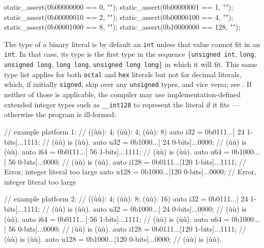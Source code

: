 \begin{emcppslisting}
static_assert(0b00000000 ==   0, "");
static_assert(0b00000001 ==   1, "");
static_assert(0b00000010 ==   2, "");
static_assert(0b00000100 ==   4, "");
static_assert(0b00001000 ==   8, "");
static_assert(0b10000000 == 128, "");
\end{emcppslisting}


\noindent The type of a binary literal
is by
default an \lstinline!int! unless that value cannot fit in an
\lstinline!int!. In that case, its type is the first type in the sequence
\{\lstinline!unsigned!~\lstinline!int!, %
 \lstinline!long!,
 \lstinline!unsigned!~\lstinline!long!, \lstinline!long!~\lstinline!long!,
\lstinline!unsigned!~\lstinline!long!~\lstinline!long!\} in which it will fit. This
same type list applies for both \lstinline!octal! and \lstinline!hex!
literals but not for decimal literals, which, if initially
\lstinline!signed!, skip over any \lstinline!unsigned! types, and vice versa;
see .
  If neither of those is applicable, the compiler may use implementation-defined extended integer types such as \lstinline!__int128! to represent the literal if it fits --- otherwise the program is ill-formed:


\begin{emcppslisting}[emcppsignore={Invalid Descriptive Literals}]
// example platform 1:
// ((ù{}ù): 4; (ù{}ù): 4; (ù{}ù): 8)
auto i32  = 0b0111...[ 24 1-bits]...1111;  // (ù{}ù) is (ù{}ù).
auto u32  = 0b1000...[ 24 0-bits]...0000;  // (ù{}ù) is (ù{}ù).
auto i64  = 0b0111...[ 56 1-bits]...1111;  // (ù{}ù) is (ù{}ù).
auto u64  = 0b1000...[ 56 0-bits]...0000;  // (ù{}ù) is (ù{}ù).
auto i128 = 0b0111...[120 1-bits]...1111;  // Error, integer literal too large
auto u128 = 0b1000...[120 0-bits]...0000;  // Error, integer literal too large

// example platform 2:
// ((ù{}ù): 4; (ù{}ù): 8; (ù{}ù): 16)
auto i32  = 0b0111...[ 24 1-bits]...1111;  // (ù{}ù)  is (ù{}ù).
auto u32  = 0b1000...[ 24 0-bits]...0000;  // (ù{}ù)  is (ù{}ù).
auto i64  = 0b0111...[ 56 1-bits]...1111;  // (ù{}ù)  is (ù{}ù).
auto u64  = 0b1000...[ 56 0-bits]...0000;  // (ù{}ù)  is (ù{}ù).
auto i128 = 0b0111...[120 1-bits]...1111;  // (ù{}ù) is (ù{}ù).
auto u128 = 0b1000...[120 0-bits]...0000;  // (ù{}ù) is (ù{}ù).
\end{emcppslisting}


